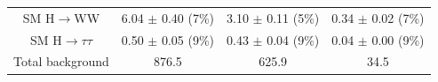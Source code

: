 \begin{table}[htb]
\begin{center}
{\begin{tabular}{c c c c }
 SM H$\to$WW           &      6.04 $\pm$       0.40  (7\%)              &       3.10 $\pm$       0.11 (5\%)             &      0.34 $\pm$       0.02 (7\%)               \\
 
 SM H$\to\tau\tau$                &      0.50 $\pm$       0.05 (9\%)              &       0.43 $\pm$       0.04 (9\%)             &      0.04 $\pm$       0.00 (9\%)               \\
      
\midrule
    Total background          &    876.5               &     625.9           &     34.5          \\
\bottomrule
\end{tabular}
}
\end{center}
\end{table}

